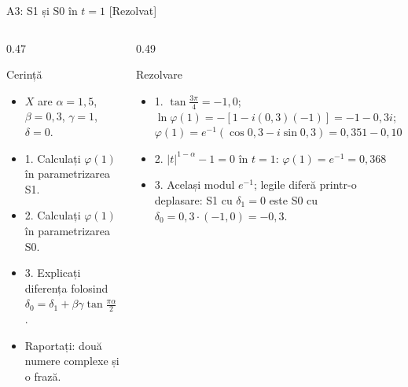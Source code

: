 \begin{frame}{A3: S1 și S0 în $t = 1$ [Rezolvat]}
\itemsize{\footnotesize}
\begin{columns}[T]
\begin{column}{0.47\textwidth}
\begin{block}{Cerință}
\begin{itemize}
    \item $X$ are $\alpha = 1{,}5$, $\beta = 0{,}3$, $\gamma = 1$, $\delta = 0$.
    \item 1. Calculați $\varphi(1)$ în parametrizarea S1.
    \item 2. Calculați $\varphi(1)$ în parametrizarea S0.
    \item 3. Explicați diferența folosind $\delta_0 = \delta_1 + \beta\gamma\tan\frac{\pi\alpha}{2}$.
    \item Raportați: două numere complexe și o frază.
\end{itemize}
\end{block}
\end{column}
\begin{column}{0.49\textwidth}
\begin{exampleblock}{Rezolvare}
\begin{itemize}
    \item 1. $\tan\frac{3\pi}{4} = -1{,}0$; $\ln\varphi(1) = -[1 - i(0{,}3)(-1)] = -1 - 0{,}3i$; $\varphi(1) = e^{-1}(\cos 0{,}3 - i\sin 0{,}3) = 0{,}351 - 0{,}109i$
    \item 2. $|t|^{1-\alpha} - 1 = 0$ în $t = 1$: $\varphi(1) = e^{-1} = 0{,}368$
    \item 3. Același modul $e^{-1}$; legile diferă printr-o deplasare: S1 cu $\delta_1 = 0$ este S0 cu $\delta_0 = 0{,}3 \cdot (-1{,}0) = -0{,}3$.
\end{itemize}
\end{exampleblock}
\end{column}
\end{columns}
\end{frame}

